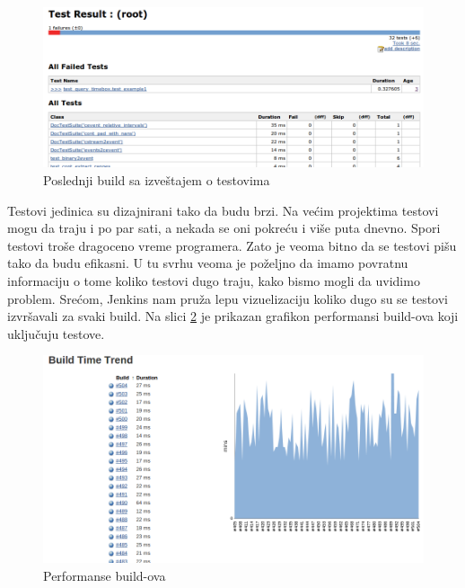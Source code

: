\begin{figure}
\begin{center}
\includegraphics[scale=0.35]{slike/test_last_build.png}
\end{center}
\caption{Poslednji build sa izveštajem o testovima}
\label{fig:test_last_build}
\end{figure}

Testovi jedinica su dizajnirani tako da budu brzi. Na većim projektima testovi mogu da traju i po par sati, a nekada se oni pokreću i više puta dnevno. Spori testovi troše dragoceno vreme programera. Zato je veoma bitno da se testovi pišu tako da budu efikasni. U tu svrhu veoma je poželjno da imamo povratnu informaciju o tome koliko testovi dugo traju, kako bismo mogli da uvidimo problem. Srećom, Jenkins nam pruža lepu vizuelizaciju koliko dugo su se testovi izvršavali za svaki build. Na slici \ref{fig:buildtimetrend} je prikazan grafikon performansi build-ova koji uključuju testove.

\begin{figure}
\begin{center}
\includegraphics[scale=0.35]{slike/buildtimetrend.png}
\end{center}
\caption{Performanse build-ova}
\label{fig:buildtimetrend}
\end{figure}

